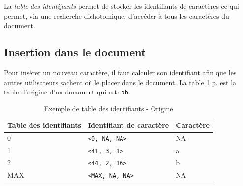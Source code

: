 		La \emph{table des identifiants} permet de stocker les identifiants de
		caractères ce qui permet, via une recherche dichotomique, d'accéder à
		tous les caractères du document.
		
	\subsection{Insertion dans le document}
	
		Pour insérer un nouveau caractère, il faut calculer son identifiant afin
		que les autres utilisateurs sachent où le placer dans le document. La
		table \ref{tab:tableID}	p.\pageref{tab:tableID} est la table d'origine
		d'un document qui est:
		\verb+ab+.\\
		\begin{table}
			\center
			\begin{tabular}{|l|l|l|}			
			\hline
				Table des identifiants & Identifiant de caractère & Caractère\\
			\hline
				0 & \verb+<0, NA, NA>+ & NA\\
				1 & \verb+<41, 3, 1>+ & a\\
				2 & \verb+<44, 2, 16>+ & b\\
				MAX & \verb+<MAX, NA, NA>+ & NA\\
			\hline
			\end{tabular}
			\caption{Exemple de table des identifiants - Origine}
			\label{tab:tableID}
		\end{table}
		

